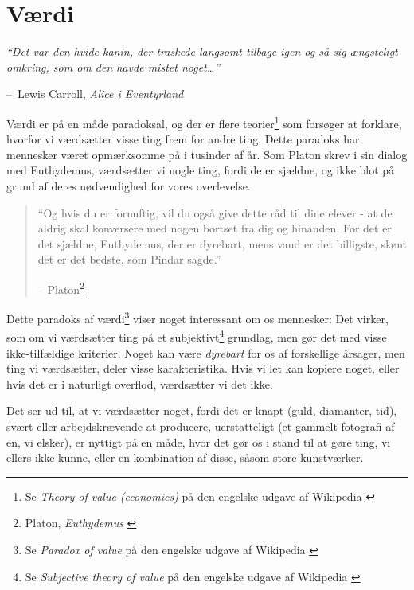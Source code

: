 \documentclass[paper=6in:9in,pagesize=pdftex,headinclude=on,footinclude=on,12pt]{scrbook}
\makeatletter
\newenvironment{chapquote}[2][4em]{\setlength{\@tempdima}{#1}%
   \def\chapquote@author{#2}%
   \parshape 1 \@tempdima \dimexpr\textwidth-2\@tempdima\relax%
   \itshape}{\par\normalfont\hfill--\ \chapquote@author\hspace*{\@tempdima}\par\bigskip}
\makeatother
\begin{document}
\chapter{Værdi}
\label{les:10}

\begin{chapquote}{Lewis Carroll, \textit{Alice i Eventyrland}}
\enquote{Det var den hvide kanin, der traskede langsomt tilbage igen og så sig ængsteligt omkring, som om den havde mistet noget\ldots}
\end{chapquote}

Værdi er på en måde paradoksal, og der er flere teorier\footnote{Se \textit{Theory of value (economics)} på den engelske udgave af Wikipedia \cite{wiki:theory-of-value}} som forsøger at forklare, hvorfor vi værdsætter visse ting frem for andre ting. Dette paradoks har mennesker været opmærksomme på i tusinder af år. Som Platon skrev i sin dialog med Euthydemus, værdsætter vi nogle ting, fordi de er sjældne, og ikke blot på grund af deres nødvendighed for vores overlevelse.\begin{quotation}\begin{samepage} \enquote{Og hvis du er fornuftig, vil du også give dette råd til dine elever - at de aldrig skal konversere med nogen bortset fra dig og hinanden. For det er det sjældne, Euthydemus, der er dyrebart, mens vand er det billigste, skønt det er det bedste, som Pindar sagde.} \begin{flushright} -- Platon\footnote{Platon, \textit{Euthydemus} \cite{euthydemus}}
\end{flushright}\end{samepage}\end{quotation}

Dette paradoks af værdi\footnote{Se \textit{Paradox of value} på den engelske udgave af Wikipedia \cite{wiki:paradox-of-value}} viser noget interessant om os mennesker: Det virker, som om vi værdsætter ting på et subjektivt\footnote{Se \textit{Subjective theory of value} på den engelske udgave af Wikipedia \cite{wiki:subjective-theory-of-value}} grundlag, men gør det med visse ikke-tilfældige kriterier. Noget kan være \textit{dyrebart} for os af forskellige årsager, men ting vi værdsætter, deler visse karakteristika. Hvis vi let kan kopiere noget, eller hvis det er i naturligt overflod, værdsætter vi det ikke.

Det ser ud til, at vi værdsætter noget, fordi det er knapt (guld, diamanter, tid), svært eller arbejdskrævende at producere, uerstatteligt (et gammelt fotografi af en, vi elsker), er nyttigt på en måde, hvor det gør os i stand til at gøre ting, vi ellers ikke kunne, eller en kombination af disse, såsom store kunstværker.
\end{document}
